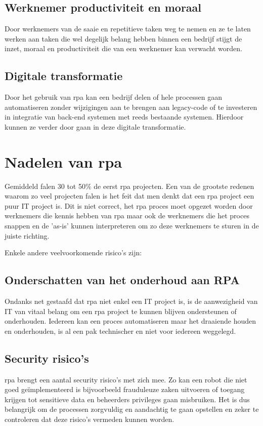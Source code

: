 \subsection{Werknemer productiviteit en moraal}
Door werknemers van de saaie en repetitieve taken weg te nemen en ze te laten werken aan taken die wel degelijk belang hebben binnen een bedrijf stijgt de inzet, moraal en productiviteit die van een werknemer kan verwacht worden. \autocite{efficiencyRPA}

\subsection{Digitale transformatie}
Door het gebruik van \acrshort{rpa} kan een bedrijf delen of hele processen gaan automatiseren zonder wijzigingen aan te brengen aan legacy-code of te investeren in integratie van back-end systemen met reeds bestaande systemen. Hierdoor kunnen ze verder door gaan in deze digitale transformatie. \autocite{efficiencyRPA}

\section{Nadelen van \acrshort{rpa}}
Gemiddeld falen 30 tot 50\% de eerst \acrshort{rpa} projecten. \autocite{everythingRPA} Een van de grootste redenen waarom zo veel projecten falen is het feit dat men denkt dat een \acrshort{rpa} project een puur IT project is. Dit is niet correct, het \acrshort{rpa} proces moet opgezet worden door werknemers die kennis hebben van \acrshort{rpa} maar ook de werknemers die het proces snappen en de 'as-is' kunnen interpreteren om zo deze werknemers te sturen in de juiste richting.

Enkele andere veelvoorkomende risico's zijn:

\subsection{Onderschatten van het onderhoud aan RPA}
Ondanks net gestaafd dat \acrshort{rpa} niet enkel een IT project is, is de aanwezigheid van IT van vitaal belang om een \acrshort{rpa} project te kunnen blijven ondersteunen of onderhouden. Iedereen kan een proces automatiseren maar het draaiende houden en onderhouden, is al een pak technischer en niet voor iedereen weggelegd. \autocite{everythingRPA}

\subsection{Security risico's}
\acrshort{rpa} brengt een aantal security risico's met zich mee. Zo kan een robot die niet goed geïmplementeerd is bijvoorbeeld frauduleuze zaken uitvoeren of toegang krijgen tot sensitieve data en beheerders privileges gaan misbruiken. Het is dus belangrijk om de processen zorgvuldig en aandachtig te gaan opstellen en zeker te controleren dat deze risico's vermeden kunnen worden. \autocite{everythingRPA} \autocite{predictionRPA}

